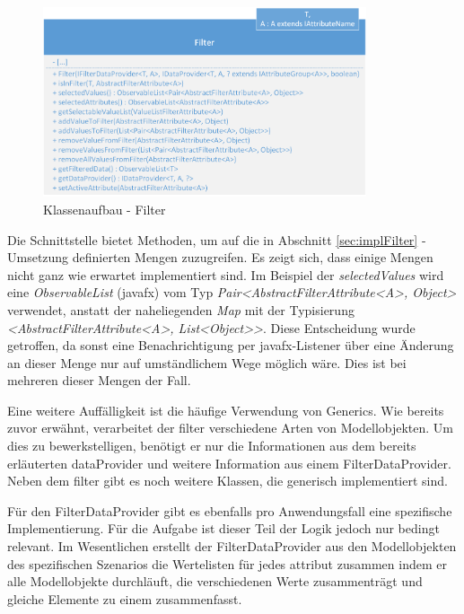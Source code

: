 \begin{figure}[H]
 \centering
 \includegraphics[width=0.85\textwidth]{grafiken/Class_Filter.png}
 \caption{Klassenaufbau - Filter}
 \label{fig:multiFilter1}
\end{figure}

Die Schnittstelle bietet Methoden, um auf die in Abschnitt \ref{sec:implFilter} - Umsetzung definierten Mengen zuzugreifen. Es zeigt sich, dass einige Mengen  nicht ganz wie erwartet implementiert sind. Im Beispiel der \textit{selectedValues} wird eine \textit{ObservableList} (\gls{javafx}) vom Typ \textit{Pair<AbstractFilterAttribute<A>, Object>} verwendet, anstatt der naheliegenden \textit{Map} mit der Typisierung \textit{<AbstractFilterAttribute<A>, List<Object>>}. Diese Entscheidung wurde getroffen, da sonst eine Benachrichtigung per \gls{javafx}-Listener über eine Änderung an dieser Menge nur auf umständlichem Wege möglich wäre. Dies ist bei mehreren dieser Mengen der Fall.

Eine weitere Auffälligkeit ist die häufige Verwendung von Generics. Wie bereits zuvor erwähnt, verarbeitet der \gls{filter} verschiedene Arten von Modellobjekten. Um dies zu bewerkstelligen, benötigt er nur die Informationen aus dem bereits erläuterten \gls{dataProvider} und weitere Information aus einem FilterDataProvider. Neben dem \gls{filter} gibt es noch weitere Klassen, die generisch implementiert sind.

Für den FilterDataProvider gibt es ebenfalls pro Anwendungsfall eine spezifische Implementierung. Für die Aufgabe ist dieser Teil der Logik jedoch nur bedingt relevant. Im Wesentlichen erstellt der FilterDataProvider aus den Modellobjekten des spezifischen Szenarios die Wertelisten für jedes \gls{attribut} zusammen indem er alle Modellobjekte durchläuft, die verschiedenen Werte zusammenträgt und gleiche Elemente zu einem zusammenfasst.

